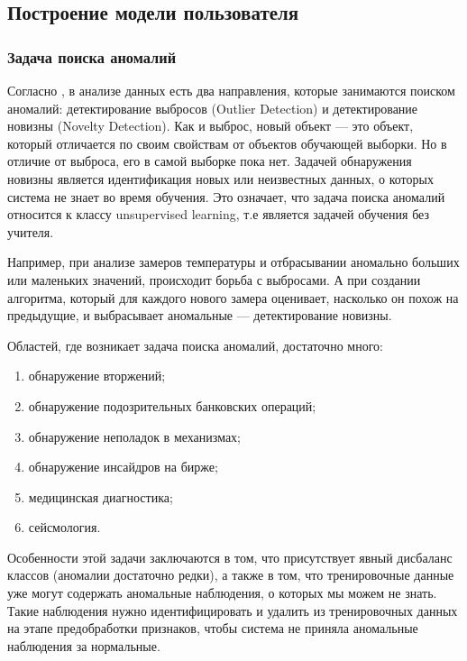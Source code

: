 \documentclass[12pt]{article}
\begin{document}
    \subsection{Построение модели пользователя}
    \label{sec:Research:Model}

    \subsubsection{Задача поиска аномалий}
    \label{sec:Research:Model:Anomaly}

    \par Согласно \cite{Dyakonov, NoveltyDetection}, в анализе данных есть два направления, которые занимаются поиском аномалий: детектирование выбросов (Outlier Detection) и детектирование новизны (Novelty Detection). Как и выброс, новый объект — это объект, который отличается по своим свойствам от объектов обучающей выборки. Но в отличие от выброса, его в самой выборке пока нет. Задачей обнаружения новизны является идентификация новых или неизвестных данных, о которых система не знает во время обучения. Это означает, что задача поиска аномалий относится к классу unsupervised learning, т.е является задачей обучения без учителя.

    \par Например, при анализе замеров температуры и отбрасывании аномально больших или маленьких значений, происходит борьба с выбросами. А при создании алгоритма, который для каждого нового замера оценивает, насколько он похож на предыдущие, и выбрасывает аномальные — детектирование новизны.

    \par Областей, где возникает задача поиска аномалий, достаточно много:

    \begin{enumerate}
        \item обнаружение вторжений;
        \item обнаружение подозрительных банковских операций;
        \item обнаружение неполадок в механизмах;
        \item обнаружение инсайдров на бирже;
        \item медицинская диагностика;
        \item сейсмология.
    \end{enumerate}

    \par Особенности этой задачи заключаются в том, что присутствует явный дисбаланс классов (аномалии достаточно редки), а также в том, что тренировочные данные уже могут содержать аномальные наблюдения, о которых мы можем не знать. Такие наблюдения нужно идентифицировать и удалить из тренировочных данных на этапе предобработки признаков, чтобы система не приняла аномальные наблюдения за нормальные.
\end{document}
